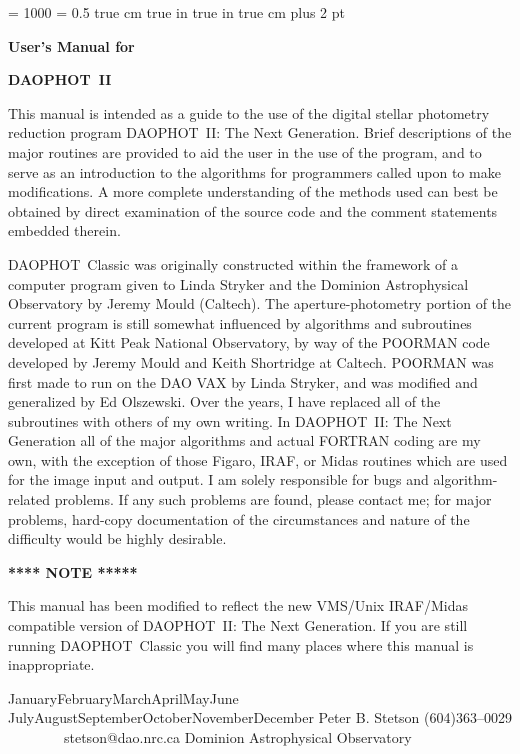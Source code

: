 \def\today{\number\year\space \ifcase\month\or
  January\or February\or March\or April\or May\or June\or
  July\or August\or September\or October\or November\or December\fi
  \space\number\day}
\magnification = 1000
\baselineskip = 0.5 true cm
 true in
 true in
 true cm
\parskip=3pt plus 2 pt
\tenrm
\centerline{}
\vfill
\centerline {\bf User's Manual for}
\centerline {\bf DAOPHOT~II}
\bigskip
\bigskip

This manual is intended as a guide to the use of the digital stellar
photometry reduction program DAOPHOT~II: The Next Generation.  Brief
descriptions of the major routines are provided to aid the user in the
use of the program, and to serve as an introduction to the algorithms
for programmers called upon to make modifications.  A more complete
understanding of the methods used can best be obtained by direct
examination of the source code and the comment statements embedded
therein.

DAOPHOT~Classic was originally constructed within the framework of a
computer program given to Linda Stryker and the Dominion Astrophysical
Observatory by Jeremy Mould (Caltech).  The aperture-photometry portion
of the current program is still somewhat influenced by algorithms and
subroutines developed at Kitt Peak National Observatory, by way of the
POORMAN code developed by Jeremy Mould and Keith Shortridge at Caltech.
POORMAN was first made to run on the DAO VAX by Linda Stryker, and was
modified and generalized by Ed Olszewski.  Over the years, I have
replaced all of the subroutines with others of my own writing. In
DAOPHOT~II: The Next Generation all of the major algorithms and actual
FORTRAN coding are my own, with the exception of those Figaro, IRAF, or
Midas routines which are used for the image input and output.  I am
solely responsible for bugs and algorithm-related problems.  If any
such problems are found, please contact me; for major problems,
hard-copy documentation of the circumstances and nature of the
difficulty would be highly desirable. 

\bigskip
\bigskip

\centerline{\bf ***** NOTE *****} 

This manual has been modified to reflect the new VMS/Unix IRAF/Midas
compatible version of DAOPHOT~II: The Next Generation.  If you are
still running DAOPHOT~Classic you will find many places where this
manual is inappropriate.

\vfill
\indent \today 
\vfill
\indent Peter B. Stetson
\bigskip
(604)363--0029$\qquad\qquad$stetson@dao.nrc.ca
\medskip
\indent Dominion Astrophysical Observatory 

